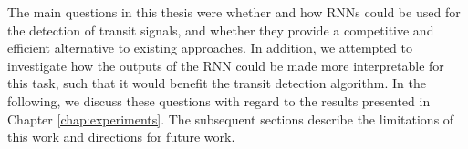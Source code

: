 
The main questions in this thesis were whether and how RNNs could be used for the detection of transit signals, and whether they provide a competitive and efficient alternative to existing approaches. In addition, we attempted to investigate how the outputs of the RNN could be made more interpretable for this task, such that it would benefit the transit detection algorithm. In the following, we discuss these questions with regard to the results presented in Chapter \ref{chap:experiments}. The subsequent sections describe the limitations of this work and directions for future work.